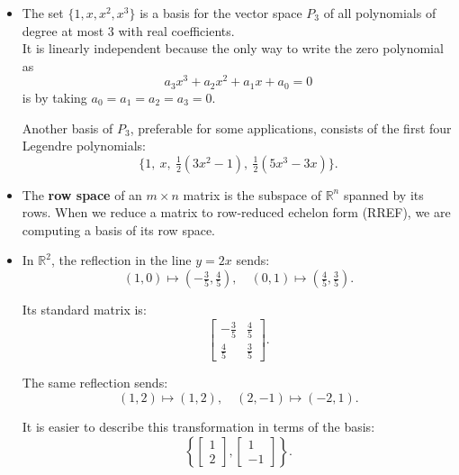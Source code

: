 \documentclass[a4paper, 9pt]{extarticle}
\begin{document}
\begin{itemize}
  \item The set $\{1, x, x^2, x^3\}$ is a basis for the vector space $P_3$ of all polynomials of degree at most 3 with real coefficients.\\

        It is linearly independent because the only way to write the zero polynomial as
        $$
          a_3 x^3 + a_2 x^2 + a_1 x + a_0 = 0
        $$
        is by taking $a_0 = a_1 = a_2 = a_3 = 0$.

        Another basis of $P_3$, preferable for some applications, consists of the first four Legendre polynomials:
        $$
          \{1,\ x,\ \tfrac{1}{2}(3x^2 - 1),\ \tfrac{1}{2}(5x^3 - 3x)\}.
        $$
  \item The \textbf{row space} of an $m \times n$ matrix is the subspace of $\mathbb{R}^n$ spanned by its rows. When we reduce a matrix to row-reduced echelon form (RREF), we are computing a basis of its row space.
  \item In $\mathbb{R}^2$, the reflection in the line $y = 2x$ sends:
        \[
          (1,0) \mapsto \left(-\tfrac{3}{5}, \tfrac{4}{5}\right), \quad
          (0,1) \mapsto \left(\tfrac{4}{5}, \tfrac{3}{5}\right).
        \]

        Its standard matrix is:
        \[
          \begin{bmatrix}
            - \tfrac{3}{5} & \tfrac{4}{5} \\
            \tfrac{4}{5}   & \tfrac{3}{5}
          \end{bmatrix}.
        \]

        The same reflection sends:
        \[
          (1,2) \mapsto (1,2), \quad
          (2, -1) \mapsto (-2,1).
        \]

        It is easier to describe this transformation in terms of the basis:
        \[
          \left\{
          \begin{bmatrix}
            1 \\ 2
          \end{bmatrix},
          \begin{bmatrix}
            1 \\ -1
          \end{bmatrix}
          \right\}.
        \]
\end{itemize}
\end{document}
